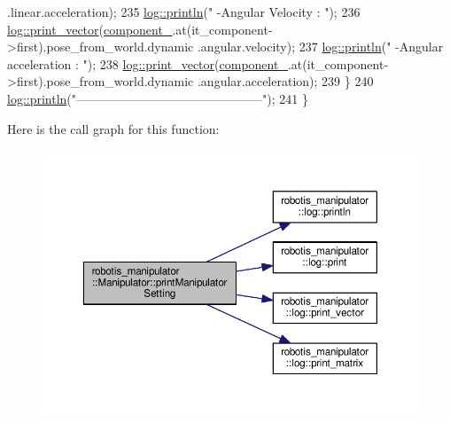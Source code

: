 \begin{DoxyCode}
      .linear.acceleration);
235     \hyperlink{namespacerobotis__manipulator_1_1log_a4a6b5b7c361aa2c61631d2c2fcfdf065}{log::println}(\textcolor{stringliteral}{" -Angular Velocity : "});
236     \hyperlink{namespacerobotis__manipulator_1_1log_ab016bbac8ea97650fc14bd1be2ccdec5}{log::print\_vector}(\hyperlink{classrobotis__manipulator_1_1_manipulator_a20b388b821f161972c2cf737fe1c26db}{component\_}.at(it\_component->first).pose\_from\_world.dynamic
      .angular.velocity);
237     \hyperlink{namespacerobotis__manipulator_1_1log_a4a6b5b7c361aa2c61631d2c2fcfdf065}{log::println}(\textcolor{stringliteral}{" -Angular acceleration : "});
238     \hyperlink{namespacerobotis__manipulator_1_1log_ab016bbac8ea97650fc14bd1be2ccdec5}{log::print\_vector}(\hyperlink{classrobotis__manipulator_1_1_manipulator_a20b388b821f161972c2cf737fe1c26db}{component\_}.at(it\_component->first).pose\_from\_world.dynamic
      .angular.acceleration);
239   \}
240   \hyperlink{namespacerobotis__manipulator_1_1log_a4a6b5b7c361aa2c61631d2c2fcfdf065}{log::println}(\textcolor{stringliteral}{"---------------------------------------------"});
241 \}
\end{DoxyCode}


Here is the call graph for this function\+:\nopagebreak
\begin{figure}[H]
\begin{center}
\leavevmode
\includegraphics[width=350pt]{classrobotis__manipulator_1_1_manipulator_a4905d7e23cba50ee7c518d078774efe8_cgraph}
\end{center}
\end{figure}




